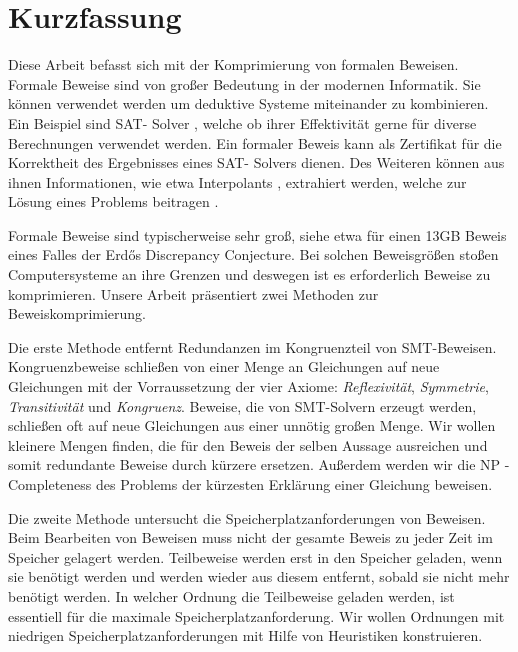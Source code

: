 \chapter*{Kurzfassung}

Diese Arbeit befasst sich mit der Komprimierung von formalen Beweisen.
Formale Beweise sind von gro{\ss}er Bedeutung in der modernen Informatik.
Sie k\"onnen verwendet werden um deduktive Systeme miteinander zu kombinieren. 
Ein Beispiel sind SAT- Solver \cite{Biere2009}, welche ob ihrer Effektivit\"at gerne f\"ur diverse Berechnungen verwendet werden.
Ein formaler Beweis kann als Zertifikat f\"ur die Korrektheit des Ergebnisses eines SAT- Solvers dienen.
Des Weiteren k\"onnen aus ihnen Informationen, wie etwa Interpolants \cite{McMill2005}, extrahiert werden, welche zur L\"osung eines Problems beitragen \cite{Hofferek2013}.

Formale Beweise sind typischerweise sehr gro{\ss}, siehe etwa \cite{Konev2014} f\"ur einen 13GB Beweis eines Falles der Erd\H{o}s Discrepancy Conjecture.
Bei solchen Beweisgr\"o{\ss}en sto{\ss}en Computersysteme an ihre Grenzen und deswegen ist es erforderlich Beweise zu komprimieren.
Unsere Arbeit pr\"asentiert zwei Methoden zur Beweiskomprimierung.

Die erste Methode entfernt Redundanzen im Kongruenzteil von SMT-Beweisen.
Kongruenzbeweise schlie{\ss}en von einer Menge an Gleichungen auf neue Gleichungen mit der Vorraussetzung der vier Axiome: \emph{Reflexivit\"at}, \emph{Symmetrie}, \emph{Transitivit\"at} und \emph{Kongruenz}.
Beweise, die von SMT-Solvern erzeugt werden, schlie{\ss}en oft auf neue Gleichungen aus einer unn\"otig gro{\ss}en Menge.
Wir wollen kleinere Mengen finden, die f\"ur den Beweis der selben Aussage ausreichen und somit redundante Beweise durch k\"urzere ersetzen.
Au{\ss}erdem werden wir die NP - Completeness des Problems der k\"urzesten Erkl\"arung einer Gleichung beweisen.

Die zweite Methode untersucht die Speicherplatzanforderungen von Beweisen.
Beim Bearbeiten von Beweisen muss nicht der gesamte Beweis zu jeder Zeit im Speicher gelagert werden.
Teilbeweise werden erst in den Speicher geladen, wenn sie ben\"otigt werden und werden wieder aus diesem entfernt, sobald sie nicht mehr ben\"otigt werden.
In welcher Ordnung die Teilbeweise geladen werden, ist essentiell f\"ur die maximale Speicherplatzanforderung.
Wir wollen Ordnungen mit niedrigen Speicherplatzanforderungen mit Hilfe von Heuristiken konstruieren.